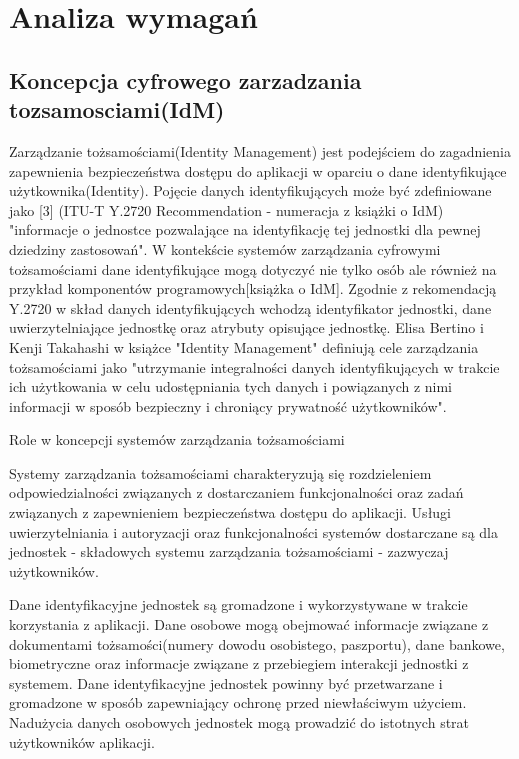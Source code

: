 \chapter{Analiza wymagań}
\label{cha:analizaWymagan}


\section{Koncepcja cyfrowego zarzadzania tozsamosciami(IdM)}
\label{sec:konceptcjaIdM}

Zarządzanie tożsamościami(Identity Management) jest podejściem do zagadnienia zapewnienia bezpieczeństwa dostępu do aplikacji w oparciu o dane identyfikujące użytkownika(Identity). Pojęcie danych identyfikujących może być zdefiniowane jako [3] (ITU-T Y.2720 Recommendation - numeracja z książki o IdM) "informacje o jednostce pozwalające na identyfikację tej jednostki dla pewnej dziedziny zastosowań". W kontekście systemów zarządzania cyfrowymi tożsamościami dane identyfikujące mogą dotyczyć nie tylko osób ale również na przykład komponentów programowych[książka o IdM]. Zgodnie z rekomendacją Y.2720 w skład danych identyfikujących wchodzą identyfikator jednostki, dane uwierzytelniające jednostkę oraz atrybuty opisujące jednostkę.
Elisa Bertino i Kenji Takahashi w książce "Identity Management" definiują cele zarządzania tożsamościami jako "utrzymanie integralności danych identyfikujących w trakcie ich użytkowania w celu udostępniania tych danych i powiązanych z nimi informacji w sposób bezpieczny i chroniący prywatność użytkowników". 

Role w koncepcji systemów zarządzania tożsamościami

Systemy zarządzania tożsamościami charakteryzują się rozdzieleniem odpowiedzialności związanych z dostarczaniem funkcjonalności oraz zadań związanych z zapewnieniem bezpieczeństwa dostępu do aplikacji. Usługi uwierzytelniania i autoryzacji oraz funkcjonalności systemów dostarczane są dla jednostek - składowych systemu zarządzania tożsamościami - zazwyczaj użytkowników.

Dane identyfikacyjne jednostek są gromadzone i wykorzystywane w trakcie korzystania z aplikacji. Dane osobowe mogą obejmować informacje związane z dokumentami tożsamości(numery dowodu osobistego, paszportu), dane bankowe, biometryczne oraz informacje związane z przebiegiem interakcji jednostki z systemem. Dane identyfikacyjne jednostek powinny być przetwarzane i gromadzone w sposób zapewniający  ochronę przed niewłaściwym użyciem. Nadużycia danych osobowych jednostek mogą prowadzić do istotnych strat użytkowników aplikacji.

